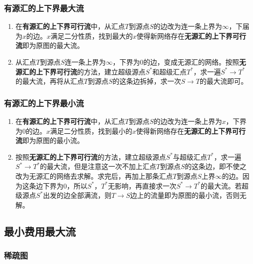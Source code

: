 \documentclass[landscape, oneside, a4paper, cs4size]{book}
\begin{document}
\begin{multicols}{2}
\begin{spacing}{0.8}
\subsubsection{有源汇的上下界最大流}


\begin{enumerate}

\item 在\textbf{有源汇的上下界可行流}中，从汇点$T$到源点$S$的边改为连一条上界为$\infty$，下届为$x$的边。$x$满足二分性质，找到最大的$x$使得新网络存在\textbf{无源汇的上下界可行流}即为原图的最大流。

\item 从汇点$T$到源点$S$连一条上界为$\infty$，下界为$0$的边，变成无源汇的网络。按照\textbf{无源汇的上下界可行流}的方法，建立超级源点$S^*$和超级汇点$T^*$，求一遍$S^* \rightarrow T^*$的最大流，再将从汇点$T$到源点$S$的这条边拆掉，求一次$S \rightarrow T$的最大流即可。

\end{enumerate}


\subsubsection{有源汇的上下界最小流}


\begin{enumerate}

\item 在\textbf{有源汇的上下界可行流}中，从汇点$T$到源点$S$的边改为连一条上界为$x$，下界为$0$的边。$x$满足二分性质，找到最小的$x$使得新网络存在\textbf{无源汇的上下界可行流}即为原图的最小流。

\item 按照\textbf{无源汇的上下界可行流}的方法，建立超级源点$S^*$与超级汇点$T^*$，求一遍$S^* \rightarrow T^*$的最大流，但是注意这一次不加上汇点$T$到源点$S$的这条边，即不使之改为无源汇的网络去求解。求完后，再加上那条汇点$T$到源点$S$上界$\infty$的边。因为这条边下界为$0$，所以$S^*$，$T^*$无影响，再直接求一次$S^* \rightarrow T^*$的最大流。若超级源点$S^*$出发的边全部满流，则$T \rightarrow S$边上的流量即为原图的最小流，否则无解。

\end{enumerate}


\subsection{最小费用最大流}


\subsubsection{稀疏图}



\end{spacing}
\end{multicols}
\end{document}
